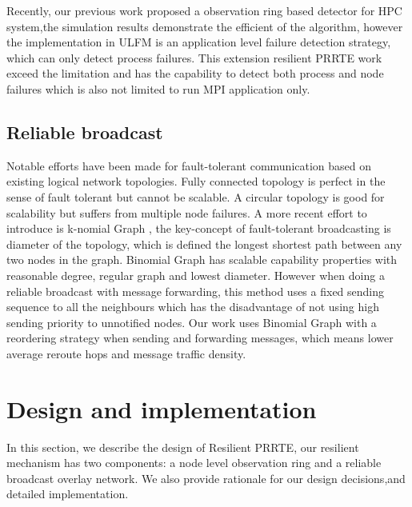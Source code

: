 \documentclass[sigconf]{acmart}
\begin{document}
Recently, our previous work \cite{George18} proposed a observation ring based detector for HPC system,the simulation results demonstrate the efficient of the algorithm, however the implementation in ULFM is an application level failure detection strategy, which can only detect process failures. This extension resilient PRRTE work exceed the limitation and has the capability to detect both process and node failures which is also not limited to run MPI application only. 

\subsection{Reliable broadcast}
Notable efforts have been made for fault-tolerant communication based on existing logical network topologies. Fully connected topology is perfect in the sense of fault tolerant but cannot be scalable. A circular topology is good for scalability but suffers from multiple node failures.  
A more recent effort to introduce is k-nomial Graph \cite{Angskun07}\cite{Pava11}, the key-concept of fault-tolerant broadcasting is diameter of the topology, which is defined the longest shortest path between any two nodes in the graph. Binomial Graph has scalable capability properties with reasonable degree, regular graph and lowest diameter. However when doing a reliable broadcast with message forwarding, this method uses a fixed sending sequence to all the neighbours which has the disadvantage of not using high sending priority to unnotified nodes. Our work uses Binomial Graph with a reordering strategy when sending and forwarding messages, which means lower average reroute hops and message traffic density.

\section{Design and implementation}

In this section, we describe the design of Resilient PRRTE, our resilient mechanism has two components: a node level observation ring and a reliable broadcast overlay network. We also provide rationale for our design decisions,and detailed implementation.
\end{document}
